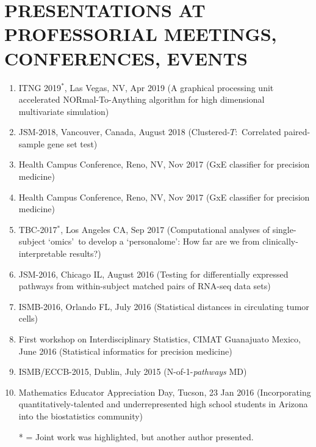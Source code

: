 \documentclass[paper=a4,fontsize=11pt]{scrartcl} %
\newcommand{\NewPart}[2]{\section*{\uppercase{#1} #2 }}
\newcommand{\TalkEntry}[4]{
		\noindent #1, #2, #3 #4}
\begin{document}

\NewPart{Presentations at professorial meetings, conferences, events}{}
\vspace{-7pt}
\begin{enumerate}

    \item \TalkEntry{ITNG 2019$^{*}$}{Las Vegas, NV}{Apr 2019}{(A graphical processing unit accelerated NORmal-To-Anything algorithm for high dimensional multivariate simulation)}
  
\item\TalkEntry{JSM-2018}{Vancouver, Canada}{August 2018}{(Clustered-$T$:~Correlated paired-sample gene set test)}
  
\item\TalkEntry{Health Campus Conference}{Reno, NV}{Nov 2017}{(GxE classifier for precision medicine)}
  
\item\TalkEntry{Health Campus Conference}{Reno, NV}{Nov 2017}{(GxE classifier for precision medicine)}
  
  \item\TalkEntry{TBC-2017$^{*}$}{Los Angeles CA}{Sep 2017}{(Computational analyses of single-subject \lq omics\rq~to develop a \lq personalome\rq: How far are we from clinically-interpretable results?)}

\item\TalkEntry{JSM-2016}{Chicago IL}{August 2016}{(Testing for differentially expressed pathways from within-subject matched pairs of RNA-seq data sets)}
\item\TalkEntry{ISMB-2016}{Orlando FL}{July 2016}{(Statistical distances in circulating tumor cells)}
\item\TalkEntry{First workshop on Interdisciplinary Statistics}{CIMAT Guanajuato Mexico}{June 2016}{(Statistical informatics for precision medicine)} 
\item\TalkEntry{ISMB/ECCB-2015}{Dublin}{July 2015}{(N-of-1-\textit{pathways} MD)} 
\item\TalkEntry{2016 Mathematics Educator Appreciation Day}{Tucson}{23 Jan 2016}{(Incorporating quantitatively-talented and underrepresented high school students in Arizona into the biostatistics community)} 
\vspace{-7pt}

* = Joint work was highlighted, but another author presented.
\end{enumerate}
\end{document}
